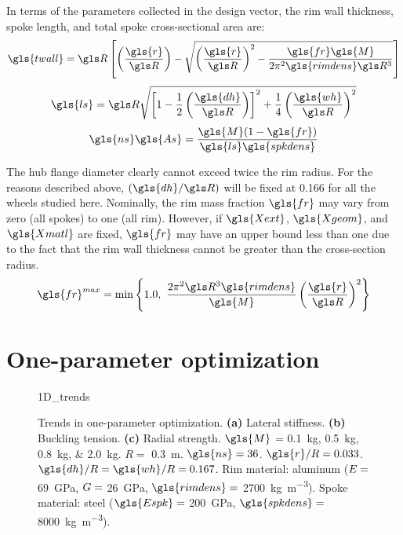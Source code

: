 \documentclass[\rootdir/thesis.tex]{subfiles}
\begin{document}
In terms of the parameters collected in the design vector, the rim wall thickness, spoke length, and total spoke cross-sectional area are:
\begin{equation}
\label{eqn:design:t}
\gls{twall} = \R\left[ \left(\frac{\gls{r}}{\R}\right) - \sqrt{\left(\frac{\gls{r}}{\R}\right)^2 - \frac{\gls{fr}\gls{M}}{2\pi^2\gls{rimdens}\R^3}}\right]
\end{equation}
\begin{equation}
\label{eqn:design:ls}
\gls{ls} = \R\sqrt{\left[1-\frac{1}{2}\left(\frac{\gls{dh}}{\R}\right)\right]^2 + \frac{1}{4}\left(\frac{\gls{wh}}{\R}\right)^2}
\end{equation}
\begin{equation}
\label{eqn:design:nsAs}
\gls{ns}\gls{As} = \frac{\gls{M}(1-\gls{fr})}{\gls{ls}\gls{spkdens}}
\end{equation}

The hub flange diameter clearly cannot exceed twice the rim radius. For the reasons described above, $(\gls{dh}/\R)$ will be fixed at 0.166 for all the wheels studied here. Nominally, the rim mass fraction $\gls{fr}$ may vary from zero (all spokes) to one (all rim). However, if $\gls{Xext}$, $\gls{Xgeom}$, and $\gls{Xmatl}$ are fixed, $\gls{fr}$ may have an upper bound less than one due to the fact that the rim wall thickness cannot be greater than the cross-section radius.
\begin{equation}
\label{eqn:frim_max}
\gls{fr}^{max} = \min\left\lbrace 1.0,\,\, \frac{2\pi^2 \R^3\gls{rimdens}}{\gls{M}}\left(\frac{\gls{r}}{\R}\right)^2 \right\rbrace
\end{equation}

\section{One-parameter optimization}

\begin{figure}
\centering
{1D_trends}
\caption{Trends in one-parameter optimization. \textbf{(a)} Lateral stiffness. \textbf{(b)} Buckling tension. \textbf{(c)} Radial strength. $\gls{M}$ = \SIlist[list-units=single]{0.1;0.5;0.8;2.0}{kg}. $R=$ \SI{0.3}{m}. $\gls{ns}=36$. $\gls{r}/R=0.033$. $\gls{dh}/R=\gls{wh}/R=0.167$. Rim material: aluminum ($E=$ \SI{69}{GPa}, $G=$ \SI{26}{GPa}, $\gls{rimdens}=$ \SI{2700}{kg.m^{-3}}). Spoke material: steel ($\gls{Espk}=$ \SI{200}{GPa}, $\gls{spkdens}=$ \SI{8000}{kg.m^{-3}}).}
\label{fig:opt_1D_trends}
\end{figure}
\end{document}
